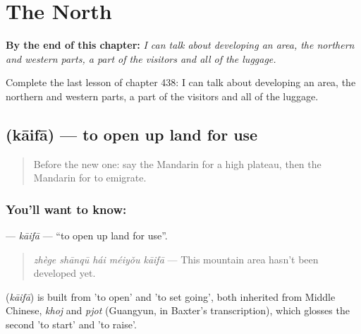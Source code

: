 
\chapter{The North}
\label{ch:zh-the-north}

\begin{chapteropening}
\textbf{By the end of this chapter:} \emph{I can talk about developing an area, the northern and western parts, a part of the visitors and all of the luggage.}

Complete the last lesson of chapter 438: I can talk about developing an area, the northern and western parts, a part of the visitors and all of the luggage.
\end{chapteropening}

\section[\texorpdfstring{\zh{开发} (kāifā)}{开发 (kāifā)}]{ (kāifā) — to open up land for use}

\label{lesson:ZH-C438-kaifa}



\begin{quote}
Before the new one: say the Mandarin for a high plateau, then the Mandarin for to emigrate.
\end{quote}

\subsection*{You'll want to know: }
\textbf{} — \emph{kāifā} — \textquotedblleft{}to open up land for use\textquotedblright{}.

\begin{quote}
\textbf{} \emph{zhège shānqū hái méiyǒu kāifā} — This mountain area hasn't been developed yet.
\end{quote}

\begin{cousinweb}
\textbf{} (\emph{kāifā}) is built from  'to open' and  'to set going', both inherited from Middle Chinese, \emph{khoj} and \emph{pjot} (Guangyun, in Baxter's transcription), which glosses the second 'to start' and 'to raise'.
\end{cousinweb}

